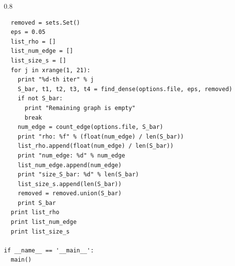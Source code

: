 \documentclass{article}
\newenvironment{myenv}[1]
  {\begin{spacing}{#1}}
  {\end{spacing}}
\begin{document}
\begin{myenv}{0.8}
\begin{verbatim}
  removed = sets.Set()
  eps = 0.05
  list_rho = []
  list_num_edge = []
  list_size_s = []
  for j in xrange(1, 21):
    print "%d-th iter" % j
    S_bar, t1, t2, t3, t4 = find_dense(options.file, eps, removed)
    if not S_bar:
      print "Remaining graph is empty"
      break
    num_edge = count_edge(options.file, S_bar)
    print "rho: %f" % (float(num_edge) / len(S_bar))
    list_rho.append(float(num_edge) / len(S_bar))
    print "num_edge: %d" % num_edge
    list_num_edge.append(num_edge)
    print "size_S_bar: %d" % len(S_bar)
    list_size_s.append(len(S_bar))
    removed = removed.union(S_bar)
    print S_bar
  print list_rho
  print list_num_edge
  print list_size_s

if __name__ == '__main__':
  main()
\end{verbatim}
\end{myenv}
\end{document}
